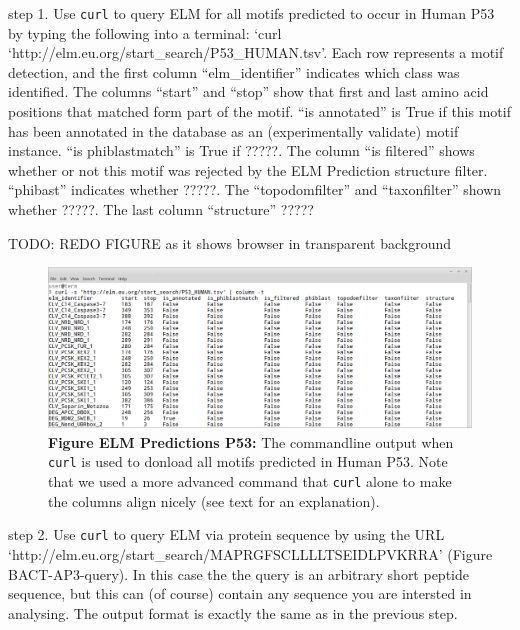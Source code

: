 step 1. Use \texttt{curl} to query ELM for all motifs predicted to occur
in Human P53 by typing the following into a terminal: `curl
`http://elm.eu.org/start\_search/P53\_HUMAN.tsv'. Each row represents a
motif detection, and the first column ``elm\_identifier'' indicates
which class was identified. The columns ``start'' and ``stop'' show that
first and last amino acid positions that matched form part of the motif.
``is annotated'' is True if this motif has been annotated in the
database as an (experimentally validate) motif instance. ``is
phiblastmatch'' is True if ?????. The column ``is filtered'' shows
whether or not this motif was rejected by the ELM Prediction structure
filter. ``phibast'' indicates whether ?????. The ``topodomfilter'' and
``taxonfilter'' shown whether ?????. The last column ``structure'' ?????


TODO: REDO FIGURE as it shows browser in transparent background

\begin{figure}[h!]
\centering
\includegraphics[width=\textwidth]{Figures/BACT_3/curl_P53.png}
\caption{
\textbf{Figure ELM Predictions P53:}
The commandline output when \texttt{curl} is used to
donload all motifs predicted in Human P53. Note that we used a more
advanced command that \texttt{curl} alone to make the columns align
nicely (see text for an explanation).
}
\end{figure}

step 2. Use \texttt{curl} to query ELM via protein sequence by using the
URL `http://elm.eu.org/start\_search/MAPRGFSCLLLLTSEIDLPVKRRA' (Figure
BACT-AP3-query). In this case the the query is an arbitrary short
peptide sequence, but this can (of course) contain any sequence you are
intersted in analysing. The output format is exactly the same as in the
previous step.

